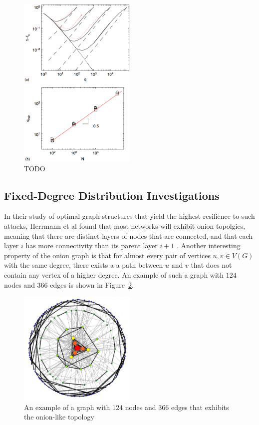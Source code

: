 \documentclass[doc]{apa}%
\begin{document}
\begin{figure}[h!]
	\label{fig:Onion}
	\centering
		\includegraphics[width=0.5\textwidth]{fractional_results.png}
	\caption{TODO}
\end{figure}


\subsection{Fixed-Degree Distribution Investigations}


In their study of optimal graph structures that yield the highest resilience to such attacks, Herrmann et al found that most networks will exhibit onion topolgies, meaning that there are distinct layers of nodes that are connected, and that each layer $i$ has more connectivity than its parent layer $i+1$ \cite{Onion}. Another interesting property of the onion graph is that for almost every pair of vertices $u, v \in V(G)$ with the same degree, there exists a a path between $u$ and $v$ that does not contain any vertex of a higher degree. An example of such a graph with $124$ nodes and $366$ edges is shown in Figure~\ref{fig:Onion}.

\begin{figure}[h!]
	\label{fig:Onion}
	\centering
		\includegraphics[width=0.5\textwidth]{Onion.jpg}
	\caption{An example of a graph with $124$ nodes and $366$ edges that exhibits the onion-like topology } %
\end{figure}
\end{document}
